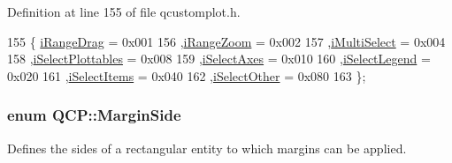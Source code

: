 Definition at line 155 of file qcustomplot.\+h.


\begin{DoxyCode}
155                  \{ \hyperlink{namespace_q_c_p_a2ad6bb6281c7c2d593d4277b44c2b037a2c4432b9aceafb94000be8d1b589ef18}{iRangeDrag}         = 0x001 
156                    ,\hyperlink{namespace_q_c_p_a2ad6bb6281c7c2d593d4277b44c2b037abee1e94353525a636aeaf0ba32b72e14}{iRangeZoom}        = 0x002 
157                    ,\hyperlink{namespace_q_c_p_a2ad6bb6281c7c2d593d4277b44c2b037aef673112c5067c3cf4cfddb62da7265d}{iMultiSelect}      = 0x004 
158                    ,\hyperlink{namespace_q_c_p_a2ad6bb6281c7c2d593d4277b44c2b037a67148c8227b4155eca49135fc274c7ec}{iSelectPlottables} = 0x008 
159                    ,\hyperlink{namespace_q_c_p_a2ad6bb6281c7c2d593d4277b44c2b037ad6644ac55bef621645326e9dd7469caa}{iSelectAxes}       = 0x010 
160                    ,\hyperlink{namespace_q_c_p_a2ad6bb6281c7c2d593d4277b44c2b037a269c9af298e257d1108edec0432b5513}{iSelectLegend}     = 0x020 
161                    ,\hyperlink{namespace_q_c_p_a2ad6bb6281c7c2d593d4277b44c2b037aea2f7c105d674e76d9b187b02ef29260}{iSelectItems}      = 0x040 
162                    ,\hyperlink{namespace_q_c_p_a2ad6bb6281c7c2d593d4277b44c2b037af67a50bc26147a13b551b3a625374949}{iSelectOther}      = 0x080 
163                  \};
\end{DoxyCode}
\hypertarget{namespace_q_c_p_a7e487e3e2ccb62ab7771065bab7cae54}{}
\subsubsection[{Margin\+Side}]{\setlength{\rightskip}{0pt plus 5cm}enum {\bf Q\+C\+P\+::\+Margin\+Side}}\label{namespace_q_c_p_a7e487e3e2ccb62ab7771065bab7cae54}
Defines the sides of a rectangular entity to which margins can be applied.

